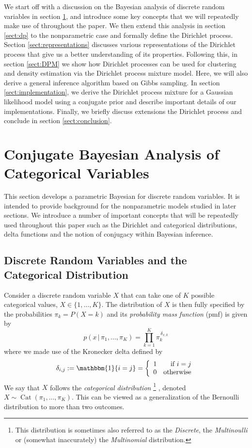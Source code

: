 \documentclass[final,3p,times,twocolumn]{elsarticle}
\DeclareMathOperator*{\Cat}{Cat}
\begin{document}
We start off with a discussion on the Bayesian analysis of discrete random variables in section \ref{sect:parametric}, and introduce some key concepts that we will repeatedly make use of throughout the paper.
We then extend this analysis in section \ref{sect:dp} to the nonparametric case and formally define the Dirichlet process.
Section \ref{sect:representations} discusses various representations of the Dirichlet process that give us a better understanding of its properties.
Following this, in section \ref{sect:DPM} we show how Dirichlet processes can be used for clustering and density estimation via the Dirichlet process mixture model. 
Here, we will also derive a general inference algorithm based on Gibbs sampling.
In section \ref{sect:implementation}, we derive the Dirichlet process mixture for a Gaussian likelihood model using a conjugate prior and describe important details of our implementations.
Finally, we briefly discuss extensions the Dirichlet process and conclude in section \ref{sect:conclusion}.


\section{Conjugate Bayesian Analysis of Categorical Variables}
\label{sect:parametric}
This section develops a parametric Bayesian for discrete random variables.
It is intended to provide background for the nonparametric models studied in later sections.
We introduce a number of important concepts that will be repeatedly used throughout this paper such as the Dirichlet and categorical distributions, delta functions and the notion of conjugacy within Bayesian inference. 

\subsection{Discrete Random Variables and the Categorical Distribution}
Consider a discrete random variable $X$ that can take one of $K$ possible categorical values, $X \in \{1,\dots,K\}$.
The distribution of $X$ is then fully specified by the probabilities $\pi_k = P(X = k)$ and its \emph{probability mass function} (pmf) is given by
\begin{equation}
\label{eqn:catpmf}
p(x\,|\,\pi_1,\dots,\pi_K) = \prod_{k=1}^K \pi_k^{\,\delta_{x,k}}
\end{equation}
where we made use of the Kronecker delta defined by
\begin{equation}
\label{eqn:kronecker}
\delta_{i,j} := \mathbbm{1}\{i = j\} = \left\{\begin{array}{lr}
1 & \mbox{if $i = j$}\\
0 & \mbox{otherwise} \end{array} \right.
\end{equation}
We say that $X$ follows the \emph{categorical distribution}
\footnote{This distribution is sometimes also referred to as the \emph{Discrete}, the \emph{Multinoulli} or (somewhat inaccurately) the \emph{Multinomial} distribution.}
, denoted $X \sim \Cat(\pi_1, \dots, \pi_K)$.
This can be viewed as a generalization of the Bernoulli distribution to more than two outcomes.
\end{document}
